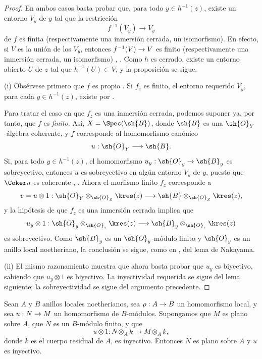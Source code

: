 \documentclass[oneside]{amsart}
\makeatletter
\newcommand{\ega@arrow}[2]{\mathchoice{#1}{#2}{#2}{#2}}
\renewcommand{\to}{\ega@arrow{\longrightarrow}{\rightarrow}}
\newcommand{\oldpage}[2][]{{\marginnote{\normalfont\textbf{#1}~|~#2}}\ignorespaces}
\let\EGAOriginalLabel\label
\renewcommand{\label}[1]{\phantomsection\EGAOriginalLabel{#1}}
\makeatother
\begin{document}
\begin{proof}
En ambos casos basta probar que, para todo
$y\in h^{-1}(z)$, existe un entorno $V_y$ de $y$ tal que
la restricción
\[
  f^{-1}(V_y)\longrightarrow V_y
\]
de $f$ es finita (respectivamente una inmersión cerrada, un isomorfismo).
En efecto, si $V$ es la unión de los $V_y$, entonces
$f^{-1}(V)\to V$ es finito (respectivamente una inmersión cerrada, un
isomorfismo) , . Como $h$ es
cerrado, existe un entorno abierto $U$ de $z$ tal que
$h^{-1}(U)\subset V$, y la proposición se sigue.

\noindent (i) Obsérvese primero que $f$ es propio
. Si
$f_z$ es finito, el entorno requerido $V_y$, para cada
$y\in h^{-1}(z)$, existe por .

\oldpage[III]{143}

Para tratar el caso en que $f_z$ es una inmersión cerrada, podemos
suponer ya, por tanto, que $f$ es \emph{finito}. Así,
$X=\Spec(\sh{B})$, donde $\sh{B}$ es una
$\sh{O}_Y$-álgebra coherente, y $f$ corresponde  al
homomorfismo canónico
\[
  u:\sh{O}_Y\longrightarrow\sh{B}.
\]
Si, para todo $y\in h^{-1}(z)$, el homomorfismo
$u_y:\sh{O}_y\to\sh{B}_y$ es sobreyectivo, entonces $u$ es sobreyectivo en
algún entorno $V_y$ de $y$, puesto que $\Coker u$ es coherente
, . Ahora el morfismo finito
$f_z$ corresponde a
\[
  v=u\otimes1:
  \sh{O}_Y\otimes_{\sh{O}_Z}\kres(z)
  \longrightarrow
  \sh{B}\otimes_{\sh{O}_Z}\kres(z),
\]
y la hipótesis de que $f_z$ es una inmersión cerrada implica que
\[
  u_y\otimes1:
  \sh{O}_y\otimes_{\sh{O}_z}\kres(z)
  \longrightarrow
  \sh{B}_y\otimes_{\sh{O}_z}\kres(z)
\]
es sobreyectivo. Como $\sh{B}_y$ es un $\sh{O}_y$-módulo finito y
$\sh{O}_y$ es un anillo local noetheriano, la conclusión se sigue, como
en , del lema de Nakayama.

\noindent (ii) El mismo razonamiento muestra que ahora
basta probar
que $u_y$ es biyectivo, sabiendo que $u_y\otimes1$ es biyectivo.
La inyectividad requerida se sigue del lema siguiente; la sobreyectividad
se sigue del argumento precedente.
\end{proof}

\begin{lemma}[4.6.7.1]
\label{III.4.6.7.1}
Sean $A$ y $B$ anillos locales noetherianos, sea
$\rho:A\to B$ un homomorfismo local, y sea $u:N\to M$ un
homomorfismo de $B$-módulos. Supongamos que $M$ es plano sobre $A$,
que $N$ es un $B$-módulo finito, y que
\[
  u\otimes1:
  N\otimes_A k\longrightarrow M\otimes_A k,
\]
donde $k$ es el cuerpo residual de $A$, es inyectivo. Entonces $N$ es
plano sobre $A$ y $u$ es inyectivo.
\end{lemma}
\end{document}
